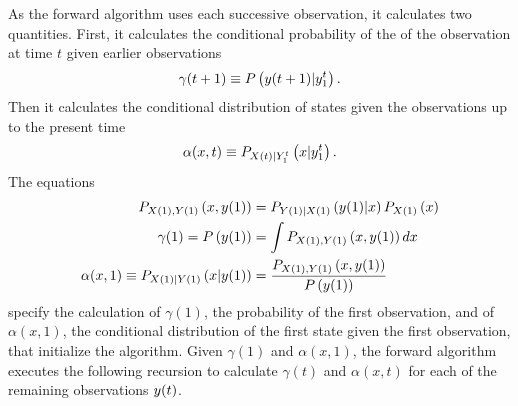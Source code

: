 As the forward algorithm uses each successive observation, it
calculates two quantities.  First, it calculates the conditional
probability of the of the observation at time $t$ given earlier
observations
\begin{equation*}
  \gamma(t+1) \equiv P\left({y}{(t+1)}|y_{1}^{t} \right).
\end{equation*}
Then it calculates the conditional distribution of states given the
observations up to the present time
\begin{equation*}
  \alpha(x,t) \equiv P_{{X}{(t)}|Y_{1}^{t}} \left(x|y_{1}^{t}
  \right).
\end{equation*}
The equations
\begin{align}
  \label{eq:ContInitial}
  P_{{X}{(1)},{Y}{(1)}} \left(x,{y}{(1)} \right) &=
  P_{{Y}{(1)}|{X}{(1)}} \left({y}{(1)}|x \right)P_{{X}{(1)}}
  \left(x \right) \\
  \gamma(1) = P\left({y}{(1)} \right) & = \int
  P_{{X}{(1)},{Y}{(1)}}
  \left(x,{y}{(1)} \right) dx \\
  \alpha(x,1) \equiv P_{{X}{(1)}|{Y}{(1)}} \left(x|{y}{(1)} \right) &=
  \frac{P_{{X}{(1)},{Y}{(1)}} \left(x,{y}{(1)}
    \right)}{P\left({y}{(1)} \right)}
\end{align}
specify the calculation of $\gamma(1)$, the probability of the first
observation, and of $\alpha(x,1)$, the conditional distribution of the
first state given the first observation, that initialize the
algorithm.  Given $\gamma(1)$ and $\alpha(x,1)$, the forward algorithm
executes the following recursion to calculate $\gamma(t)$ and
$\alpha(x,t)$ for each of the remaining observations ${y}{(t)}$.
